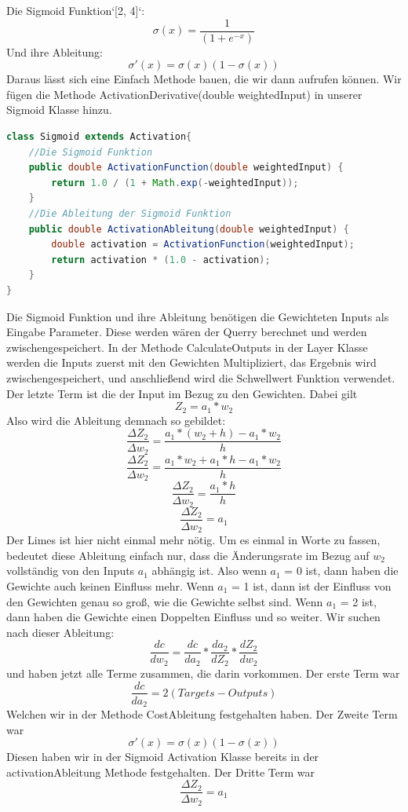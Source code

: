 \documentclass[12pt]{article}
\begin{document}
Die Sigmoid Funktion`[2, 4]`:
$$\sigma (x)=\frac{1}{(1+e^{-x})}$$
Und ihre Ableitung:
$$\sigma '(x)=\sigma (x)(1-\sigma(x))$$
Daraus lässt sich eine Einfach Methode bauen, die wir dann aufrufen können. Wir fügen die Methode ActivationDerivative(double weightedInput) in unserer Sigmoid Klasse hinzu.\begin{lstlisting}[language=Java]
class Sigmoid extends Activation{
    //Die Sigmoid Funktion
    public double ActivationFunction(double weightedInput) {
        return 1.0 / (1 + Math.exp(-weightedInput));
    }
    //Die Ableitung der Sigmoid Funktion
    public double ActivationAbleitung(double weightedInput) {
        double activation = ActivationFunction(weightedInput);
        return activation * (1.0 - activation);
    }
}
\end{lstlisting}Die Sigmoid Funktion und ihre Ableitung benötigen die Gewichteten Inputs als Eingabe Parameter. Diese werden wären der Querry berechnet und werden zwischengespeichert. In der Methode CalculateOutputs in der Layer Klasse werden die Inputs zuerst mit den Gewichten Multipliziert, das Ergebnis wird zwischengespeichert, und anschließend wird die Schwellwert Funktion verwendet. Der letzte Term ist die der Input im Bezug zu den Gewichten.
Dabei gilt 
$$Z_2 = a_1*w_2$$
Also wird die Ableitung demnach so gebildet:
$$\frac{\Delta Z_2}{\Delta w_2}=\frac{a_1*(w_2+h)-a_1*w_2}{h}$$
$$\frac{\Delta Z_2}{\Delta w_2}=\frac{a_1*w_2+a_1*h-a_1*w_2}{h}$$
$$\frac{\Delta Z_2}{\Delta w_2}=\frac{a_1*h}{h}$$
$$\frac{\Delta Z_2}{\Delta w_2}=a_1$$
Der Limes ist hier nicht einmal mehr nötig. Um es einmal in Worte zu fassen, bedeutet diese Ableitung einfach nur, dass die Änderungsrate im Bezug auf $w_2$ vollständig von den Inputs $a_1$ abhängig ist. Also wenn $a_1$ = 0 ist, dann haben die Gewichte auch keinen Einfluss mehr. Wenn $a_1$ = 1 ist, dann ist der Einfluss von den Gewichten genau so groß, wie die Gewichte selbst sind. Wenn $a_1$ = 2 ist, dann haben die Gewichte einen Doppelten Einfluss und so weiter. Wir suchen nach dieser Ableitung:
$$\frac{ dc }{ dw_{ 2 } }=
\frac{ dc }{ da_{ 2 } }*
\frac{ da_{ 2 } }{ dZ_{ 2 } }*
\frac{ dZ_{ 2 } }{ dw_{ 2 } }$$
und haben jetzt alle Terme zusammen, die darin vorkommen. Der erste Term war 
$$\frac{dc}{da_2}=2(Targets-Outputs)$$
Welchen wir in der Methode CostAbleitung festgehalten haben.
Der Zweite Term war
$$\sigma '(x)=\sigma (x)(1-\sigma(x))$$
Diesen haben wir in der Sigmoid Activation Klasse bereits in der activationAbleitung Methode festgehalten.
Der Dritte Term war
$$\frac{\Delta Z_2}{\Delta w_2}=a_1$$
\end{document}
